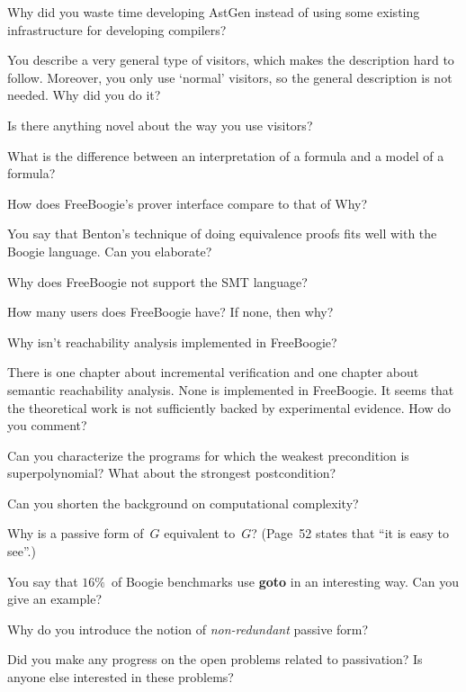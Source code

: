 
\Q Why did you waste time developing AstGen instead of using some existing
infrastructure for developing compilers?

\Q You describe a very general type of visitors, which makes the
description hard to follow. Moreover, you only use `normal' visitors, so
the general description is not needed. Why did you do it?

\Q Is there anything novel about the way you use visitors?

\Q What is the difference between an interpretation of a formula and a
model of a formula?

\Q How does FreeBoogie's prover interface compare to that of Why?

\Q You say that Benton's technique of doing equivalence proofs fits well
with the Boogie language. Can you elaborate?

\Q Why does FreeBoogie not support the SMT language?


\Q How many users does FreeBoogie have? If none, then why?

\Q Why isn't reachability analysis implemented in FreeBoogie?

\Q There is one chapter about incremental verification and one chapter
about semantic reachability analysis. None is implemented in FreeBoogie. It
seems that the theoretical work is not sufficiently backed by experimental
evidence.  How do you comment?

\Q Can you characterize the programs for which the weakest precondition is
superpolynomial? What about the strongest postcondition?

\Q Can you shorten the background on computational complexity?


\Q Why is a passive form of~$G$ equivalent to~$G$? (Page~52 states that ``it
is easy to see''.)

\Q You say that $16\%$~of Boogie benchmarks use {\bf goto} in an
interesting way. Can you give an example?

\Q Why do you introduce the notion of {\it non-redundant\/} passive
form?


\Q Did you make any progress on the open problems related to passivation?
Is anyone else interested in these problems?

